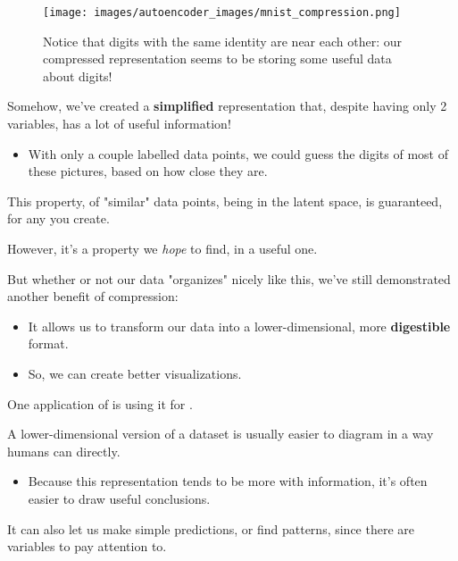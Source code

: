        \begin{figure}[H]
            \centering
            \texttt{[image: images/autoencoder\_images/mnist\_compression.png]}
            \caption*{Notice that digits with the same identity are near each other: our compressed representation seems to be storing some useful data about digits!}
        \end{figure}
    
        Somehow, we've created a \textbf{simplified} representation that, despite having only 2 variables, has a lot of useful information!

        \begin{itemize}
            \item With only a couple labelled data points, we could guess the digits of most of these pictures, based on how close they are.\\
        \end{itemize}

        \begin{clarification}
            This property, of "similar" data points, being  in the latent space, is  guaranteed, for any  you create.

            However, it's a property we \textit{hope} to find, in a useful one.
        \end{clarification}

        But whether or not our data "organizes" nicely like this, we've still demonstrated another benefit of compression:

        \begin{itemize}
            \item It allows us to transform our data into a lower-dimensional, more \textbf{digestible} format.
            \item So, we can create better visualizations.\\
        \end{itemize}

    
        \begin{concept}
            One application of  is using it for .
    
            A lower-dimensional version of a dataset is usually easier to diagram in a way humans can  directly.

            \begin{itemize}
                \item Because this representation tends to be more  with information, it's often easier to draw useful conclusions.
            \end{itemize}
    
            It can also let us make simple predictions, or find patterns, since there are  variables to pay attention to.
        \end{concept}


